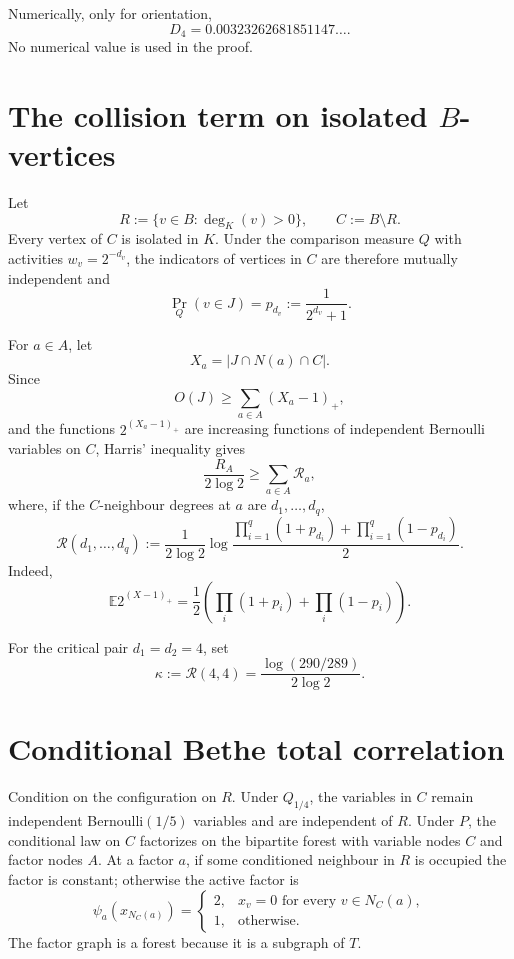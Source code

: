 \documentclass[11pt]{article}
\newcommand{\E}{\mathbb E}
\begin{document}
Numerically, only for orientation,
\begin{equation}\label{eq:D4num}
 D_4=0.00323262681851147\ldots .
\end{equation}
No numerical value is used in the proof.

\section{The collision term on isolated $B$-vertices}

Let
\[
 R:=\{v\in B:\deg_K(v)>0\},
 \qquad
 C:=B\setminus R.
\]
Every vertex of $C$ is isolated in $K$.  Under the comparison measure $Q$ with activities
$w_v=2^{-d_v}$, the indicators of vertices in $C$ are therefore mutually independent and
\[
 \Pr_Q(v\in J)=p_{d_v}:=\frac1{2^{d_v}+1}.
\]

For $a\in A$, let
\[
 X_a=|J\cap N(a)\cap C|.
\]
Since
\[
 O(J)\ge\sum_{a\in A}(X_a-1)_+,
\]
and the functions $2^{(X_a-1)_+}$ are increasing functions of independent Bernoulli variables on $C$, Harris' inequality gives
\begin{equation}\label{eq:collision-factor}
 \frac{R_A}{2\log2}
 \ge\sum_{a\in A}\mathcal R_a,
\end{equation}
where, if the $C$-neighbour degrees at $a$ are $d_1,\ldots,d_q$,
\begin{equation}\label{eq:Rlocal}
 \mathcal R(d_1,\ldots,d_q)
 :=\frac1{2\log2}
 \log\frac{\prod_{i=1}^q(1+p_{d_i})+\prod_{i=1}^q(1-p_{d_i})}{2}.
\end{equation}
Indeed,
\[
 \E 2^{(X-1)_+}
 =\frac12\left(\prod_i(1+p_i)+\prod_i(1-p_i)\right).
\]

For the critical pair $d_1=d_2=4$, set
\begin{equation}\label{eq:kappa}
 \kappa:=\mathcal R(4,4)
 =\frac{\log(290/289)}{2\log2}.
\end{equation}

\section{Conditional Bethe total correlation}

Condition on the configuration on $R$.  Under $Q_{1/4}$, the variables in $C$ remain independent Bernoulli$(1/5)$ variables and are independent of $R$.
Under $P$, the conditional law on $C$ factorizes on the bipartite forest with variable nodes $C$ and factor nodes $A$.  At a factor $a$, if some conditioned neighbour in $R$ is occupied the factor is constant; otherwise the active factor is
\[
 \psi_a(x_{N_C(a)})=
 \begin{cases}
 2,&x_v=0\text{ for every }v\in N_C(a),\\
 1,&\text{otherwise.}
 \end{cases}
\]
The factor graph is a forest because it is a subgraph of $T$.
\end{document}
